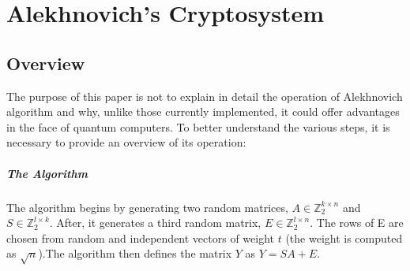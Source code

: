 \section{Alekhnovich's Cryptosystem}
\subsection{Overview}
The purpose of this paper is not to explain in detail the operation of Alekhnovich algorithm and why, unlike those currently implemented, it could offer advantages in the face of quantum computers. To better understand the various steps, it is necessary to provide an overview of its operation:
\subparagraph{The Algorithm} The algorithm begins by generating two random matrices, $A\in \mathbb{Z}^{k\times n}_2$ and $S\in \mathbb{Z}^{l\times k}_2$. After, it generates a third random matrix, $E\in \mathbb{Z}^{l\times n}_2$. The rows of E are chosen from random and independent vectors of weight $t$ (the weight is computed as $\sqrt{n}$).The algorithm then defines the matrix $Y$ as $Y = SA + E$.


